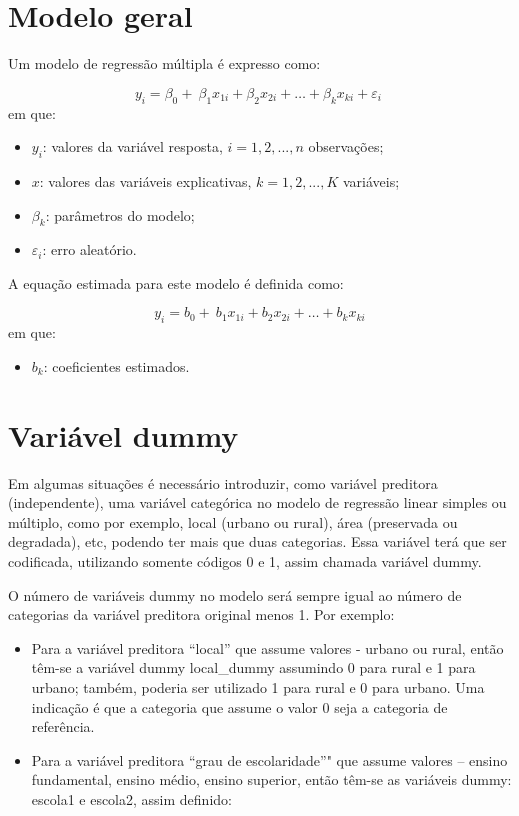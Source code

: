 \documentclass[12pt,brazil,oneside]{book}
\providecommand{\tightlist}{%
  \setlength{\itemsep}{0pt}\setlength{\parskip}{0pt}}
\begin{document}
\hypertarget{modelo-geral}{%
\section{Modelo geral}\label{modelo-geral}}

Um modelo de regressão múltipla é expresso como:

\[ 
y_{i} = \beta_0+\ \beta_1x_{1i}+\beta_2x_{2i}+\dots+\beta_kx_{ki}+\varepsilon_i\ 
\] \noindent em que:

\begin{itemize}
\item
  \(y_{i}\): valores da variável resposta, \(i = 1, 2,..., n\)
  observações;
\item
  \(x\): valores das variáveis explicativas, \(k = 1, 2,..., K\)
  variáveis;
\item
  \(\beta_k\): parâmetros do modelo;
\item
  \(\varepsilon_i\): erro aleatório.
\end{itemize}

A equação estimada para este modelo é definida como:

\[ 
y_{i} = b_0+\ b_1x_{1i}+b_2x_{2i}+\dots+b_kx_{ki} 
\] em que:

\begin{itemize}
\tightlist
\item
  \(b_k\): coeficientes estimados.
\end{itemize}

\hypertarget{variavel-dummy}{%
\section{Variável dummy}\label{variavel-dummy}}

Em algumas situações é necessário introduzir, como variável preditora
(independente), uma variável categórica no modelo de regressão linear
simples ou múltiplo, como por exemplo, local (urbano ou rural), área
(preservada ou degradada), etc, podendo ter mais que duas categorias.
Essa variável terá que ser codificada, utilizando somente códigos 0 e 1,
assim chamada variável dummy.

O número de variáveis dummy no modelo será sempre igual ao número de
categorias da variável preditora original menos 1. Por exemplo:

\begin{itemize}
\item
  Para a variável preditora ``local'' que assume valores - urbano ou
  rural, então têm-se a variável dummy local\_dummy assumindo 0 para
  rural e 1 para urbano; também, poderia ser utilizado 1 para rural e 0
  para urbano. Uma indicação é que a categoria que assume o valor 0 seja
  a categoria de referência.
\item
  Para a variável preditora ``grau de escolaridade''" que assume valores
  -- ensino fundamental, ensino médio, ensino superior, então têm-se as
  variáveis dummy: escola1 e escola2, assim definido:
\end{itemize}
\end{document}
